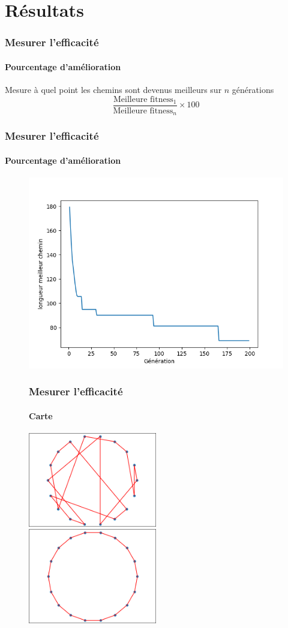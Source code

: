 \documentclass[16pt]{beamer}
\begin{document}
\section{Résultats}
\begin{frame}
  \frametitle{Mesurer l'efficacité}
  \framesubtitle{Pourcentage d'amélioration}
  \centering
  Mesure à quel point les chemins sont devenus meilleurs sur $n$ générations \pause{}
  \[
    \frac{\text{Meilleure fitness}_1}{\text{Meilleure fitness}_n} \times 100
  \]
\end{frame}

\begin{frame}
  \frametitle{Mesurer l'efficacité}
  \framesubtitle{Pourcentage d'amélioration}
  \begin{figure}
    \includegraphics[scale=0.5]{evol.png}
  \end{figure}
\end{frame}

\begin{frame}
  \begin{figure}
  \frametitle{Mesurer l'efficacité}
  \framesubtitle{Carte}
    \includegraphics[width=0.5\textwidth]{gen1.png}
    \includegraphics[width=0.5\textwidth]{gen200.png}
  \end{figure}
\end{frame}
\end{document}
